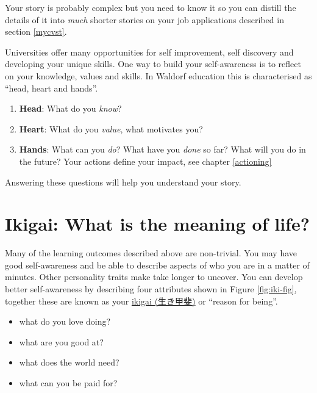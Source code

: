 \documentclass[
]{book}
\providecommand{\tightlist}{%
  \setlength{\itemsep}{0pt}\setlength{\parskip}{0pt}}
\begin{document}
Your story is probably complex but you need to know it so you can distill the details of it into \emph{much} shorter stories on your job applications described in section \ref{mycvst}.

Universities offer many opportunities for self improvement, self discovery and developing your unique skills. One way to build your self-awareness is to reflect on your knowledge, values and skills. In Waldorf education this is characterised as ``head, heart and hands''. \citep{headhearthands}

\begin{enumerate}
\def\labelenumi{\arabic{enumi}.}
\tightlist
\item
  \textbf{Head}: What do you \emph{know}?
\item
  \textbf{Heart}: What do you \emph{value}, what motivates you?
\item
  \textbf{Hands}: What can you \emph{do}? What have you \emph{done} so far? What will you do in the future? Your actions define your impact, see chapter \ref{actioning}
\end{enumerate}

Answering these questions will help you understand your story.

\hypertarget{no42}{%
\section{Ikigai: What is the meaning of life?}\label{no42}}

Many of the learning outcomes described above are non-trivial. You may have good self-awareness and be able to describe aspects of who you are in a matter of minutes. Other personality traits make take longer to uncover. You can develop better self-awareness by describing four attributes shown in Figure \ref{fig:iki-fig}, together these are known as your \href{https://en.wikipedia.org/wiki/Ikigai}{ikigai (生き甲斐)} or ``reason for being''.

\begin{itemize}
\tightlist
\item
  what do you love doing?
\item
  what are you good at?
\item
  what does the world need?
\item
  what can you be paid for?
\end{itemize}
\end{document}
